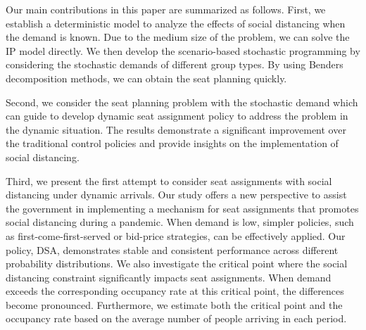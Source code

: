 

Our main contributions in this paper are summarized as follows. First, we establish a deterministic model to analyze the effects of social distancing when the demand is known. Due to the medium size of the problem, we can solve the IP model directly. We then develop the scenario-based stochastic programming by considering the stochastic demands of different group types. By using Benders decomposition methods, we can obtain the seat planning quickly. 

Second, we consider the seat planning problem with the stochastic demand which can guide to develop dynamic seat assignment policy to address the problem in the dynamic situation. The results demonstrate a significant improvement over the traditional control policies and provide insights on the implementation of social distancing.

Third, we present the first attempt to consider seat assignments with social distancing under dynamic arrivals. Our study offers a new perspective to assist the government in implementing a mechanism for seat assignments that promotes social distancing during a pandemic. When demand is low, simpler policies, such as first-come-first-served or bid-price strategies, can be effectively applied.
Our policy, DSA, demonstrates stable and consistent performance across different probability distributions. We also investigate the critical point where the social distancing constraint significantly impacts seat assignments. When demand exceeds the corresponding occupancy rate at this critical point, the differences become pronounced. Furthermore, we estimate both the critical point and the occupancy rate based on the average number of people arriving in each period.



